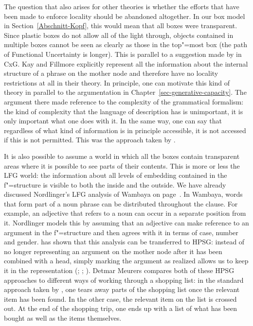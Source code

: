 The question that also arises for other theories is whether the efforts that have been made to enforce locality should be abandoned altogether.
In our box model in Section~\ref{Abschnitt-Kopf}, this would mean that all boxes were transparent. Since plastic boxes do not allow
all of the light through, objects contained in multiple boxes cannot be seen as clearly as those in the top"=most box (the path
of Functional Uncertainty is longer). This is parallel to a suggestion made by
\citet{KF99a} in CxG\indexcxg. Kay and Fillmore explicitly represent all the information about the internal structure of a phrase on the mother
node and therefore have no locality restrictions at all in their theory. In principle, one can
motivate this kind of theory in parallel to the argumentation in Chapter~\ref{sec-generative-capacity}. The argument
there made reference to the complexity of the grammatical formalism: the kind of complexity that the
language of description has is unimportant, it is only important what one does with it. In the same way, one can say that regardless of what kind of information
is  in principle accessible, it is not accessed if this is not permitted. This was the approach taken by \citet[--145]{ps}.

It\label{page-Bender-Wambaya-two} is also possible to assume a world in which all the boxes contain transparent areas where it is possible to see parts of their contents.
This is more or less the LFG world\indexlfg: the information about all levels of embedding contained in the f"=structure is
visible to both the inside and the outside. We have already discussed Nordlinger's \citeyearpar{Nordlinger98a-u} LFG analysis of Wambaya 
on page~\pageref{Seite-Bender-Wambaya}.
In Wambaya, words that form part of a noun phrase can be distributed throughout the clause. For example, an adjective that refers to a noun
can occur in a separate position from it. Nordlinger models this by assuming that an adjective can make reference to an argument in the f"=structure
and then agrees with it in terms of case, number and gender. \citet{Bender2008a} has shown that this analysis can be transferred to HPSG\indexhpsg:
instead of no longer representing an argument on the mother node after it has been combined with a head, simply marking the argument as realized
allows us to keep it in the representation (\citealp{Meurers99b}; \citealp{Prze99};
\citealp[Section~17.4]{MuellerLehrbuch1}). Detmar Meurers compares both of these HPSG approaches to different ways of working through a shopping list: in the standard approach taken by \citet{ps2},
one tears away parts of the shopping list once the relevant item has been found. In the other case, the relevant item on the list is crossed out.
At the end of the shopping trip, one ends up with a list of what has been bought as well as the items themselves.
  
